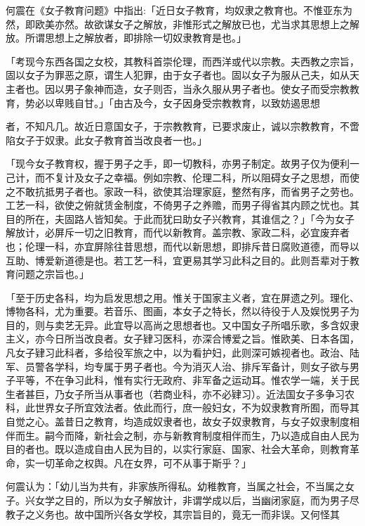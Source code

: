 何震在《女子教育问题》中指出:「近日女子教育，均奴隶之教育也。不惟亚东为然，即欧美亦然。故欲谋女子之解放，非惟形式之解放已也，尤当求其思想上之解放。所谓思想上之解放者，即排除一切奴隶教育是也。」

「考现今东西各国之女校，其教科首崇伦理，而西洋或代以宗教。夫西教之宗旨，固以女子为罪恶之原，谓生人犯罪，由于女子者也。固以女子为服从己夫，如从天主者也。因以男子象神而造，女子则否，当永久服从男子者也。使女子而受宗教教育，势必以卑贱自甘。」「由古及今，女子因身受宗教教育，以致妨遏思想


\noindent 者，不知凡几。故近日意国女子，于宗教教育，已要求废止，诚以宗教教育，不啻陷女子于奴隶。此女子教育首当改良者一也。」

「现今女子教育权，握于男子之手，即一切教科，亦男子制定。故男子仅为便利一己计，而不复计及女子之幸福。例如宗教、伦理二科，所以阻碍女子之思想，而使之不敢抗抵男子者也。家政一科，欲使其治理家庭，整然有序，而省男子之劳也。工艺一科，欲使之俯就赁金制度，不倚男子之养赡，而男子得省其内顾之忧也。其目的所在，夫固路人皆知矣。于此而犹曰助女子兴教育，其谁信之？」「今为女子解放计，必屏斥一切之旧教育，而代以新教育。盖宗教、家政二科，必宜废弃者也；伦理一科，亦宜屏除往昔思想，而代以新思想，即排斥昔日腐败道德，而导以互助、博爱新道德是也。若工艺一科，宜更易其学习此科之目的。此则吾辈对于教育问题之宗旨也。」

「至于历史各科，均为启发思想之用。惟关于国家主义者，宜在屏遗之列。理化、博物各科，尤为重要。若音乐、图画，本女子之特长，然以待役于人及娱悦男子为目的，则与卖艺无异。此宜导以高尚之思想者也。又中国女子所唱乐歌，多含奴隶主义，亦今日所当改良者。女子肄习医科，亦深合博爱之旨。惟欧美、日本各国，凡女子肄习此科者，多给役军旅之中，以为看护妇，此则深可嫉视者也。政治、陆军、员警各学科，均专属于男子者也。今为消灭人治、排斥军备计，则女子欲与男子平等，不在争习此科，惟有实行无政府、非军备之运动耳。惟农学一端，关于民生者甚巨，乃女子所当从事者也（若商业科，亦不必肄习）。近法国女子多争习农科，此世界女子所宜效法者。依此而行，庶一般妇女，不为奴隶教育所囿，而导其自觉之心。盖昔日之教育，均造成奴隶者也，故女子奴隶教育，与女子奴隶制度相伴而生。嗣今而降，新社会之制，亦与新教育制度相伴而生，乃以造成自由人民为目的者也。既以造成自由人民为目的，以实行家庭、国家、社会大革命，则教育革命，实一切革命之权舆。凡在女界，可不从事于斯乎？」

何震认为：「幼儿当为共有，非家族所得私。幼稚教育，当属之社会，不当属之女子。兴女学之目的，所以为女子解放计，非谓学成以后，当幽闭家庭，而为男子尽教子之义务也。故中国所兴各女学校，其宗旨目的，竟无一而非误。又何怪其


